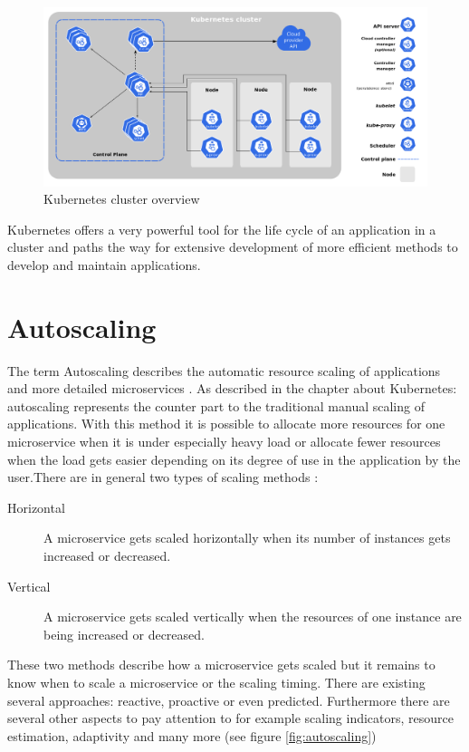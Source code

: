 \documentclass[
	ngerman,
	ruledheaders=section,%
	class=report,%
	thesis={type=master},%
	accentcolor=8c,%
	custommargins=false,%
	marginpar=false,%
	parskip=half-,%
	fontsize=11pt,%
]{tudapub}
\begin{document}
\begin{figure}[h]
    \centering
    \includegraphics[width=\textwidth]{data/basics/kubernetes-cluster.png}
    \caption{Kubernetes cluster overview \cite{kubernetesdoc2020}}
    \label{fig:kubernetes-cluster}
\end{figure}

Kubernetes offers a very powerful tool for the life cycle of an application in a cluster and paths the way for extensive development of more efficient methods to develop and maintain applications.
\newpage
\section{Autoscaling}
The term Autoscaling describes the automatic resource scaling of applications and more detailed microservices \cite{qu2018auto, midigudla2019performance}. As described in the chapter about Kubernetes: autoscaling represents the counter part to the traditional manual scaling of applications. With this method it is possible to allocate more resources for one microservice when it is under especially heavy load or allocate fewer resources when the load gets easier depending on its degree of use in the application by the user.There are in general two types of scaling methods \cite{qu2018auto, midigudla2019performance}: 

\begin{description}
\item[Horizontal] A microservice gets scaled horizontally when its number of instances gets increased or decreased.
\item[Vertical] A microservice gets scaled vertically when the resources of one instance are being increased or decreased.
\end{description}

These two methods describe how a microservice gets scaled but it remains to know when to scale a microservice or the scaling timing. There are existing several approaches: reactive, proactive or even predicted. Furthermore there are several other aspects to pay attention to for example scaling indicators, resource estimation, adaptivity and many more (see figure \ref{fig:autoscaling})\\
\end{document}
